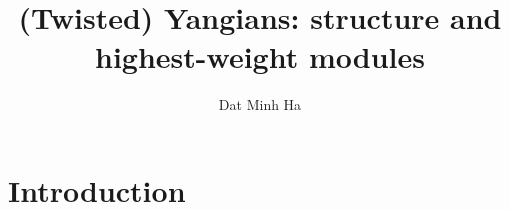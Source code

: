 

\setcounter{section}{-1}





    \title{
        (Twisted) Yangians: structure and highest-weight modules
    }
    
    \author{Dat Minh Ha}
    \maketitle
    
    \begin{abstract}
        
    \end{abstract}
    
    {
    \hypersetup{} 
    \tableofcontents %
    }

    \section{Introduction}

    

    

    

    

    \begin{appendices}
        

        
    \end{appendices}
    
    \printbibliography

